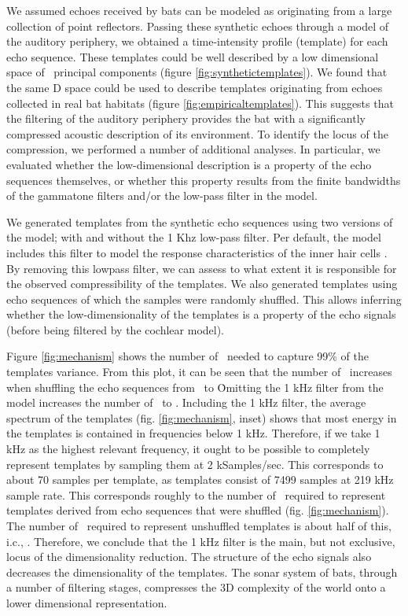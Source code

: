 \documentclass[preprint,5p]{elsarticle}
\begin{document}
We assumed echoes received by bats can be modeled as originating from a large collection of point reflectors. Passing these synthetic echoes through a model of the auditory periphery, we obtained a time-intensity profile (template) for each echo sequence. These templates could be well described by a low dimensional space of \pca\ principal components (figure \ref{fig:synthetictemplates}). We found that the same \pca D space could be used to describe templates originating from echoes collected in real bat habitats (figure \ref{fig:empiricaltemplates}). This suggests that the filtering of the auditory periphery provides the bat with a significantly compressed acoustic description of its environment. To identify the locus of the compression, we performed a number of additional analyses. In particular, we evaluated whether the low-dimensional description is a property of the echo sequences themselves, or whether this property results from the finite bandwidths of the gammatone filters and/or the low-pass filter in the \citet{Wiegrebe2008} model.

We generated templates from the synthetic echo sequences using two versions of the \citet{Wiegrebe2008} model; with and without the 1 Khz low-pass filter. Per default, the model includes this filter to model the response characteristics of the inner hair cells \citep{Meddis2006,Reijniers2010a}. By removing this lowpass filter, we can assess to what extent it is responsible for the observed compressibility of the templates. We also generated templates using echo sequences of which the samples were randomly shuffled. This allows inferring whether the low-dimensionality of the templates is a property of the echo signals (before being filtered by the cochlear model). 

Figure \ref{fig:mechanism} shows the number of \pcs\ needed to capture 99\% of the templates variance. From this plot, it can be seen that the number of \pcs\ increases when shuffling the echo sequences from \pca\ to \FigVIIInumberIII\. Omitting the 1 kHz filter from the  \citet{Wiegrebe2008} model increases the number of \pcs\ to \FigVIIInumberII. Including the 1 kHz filter, the average spectrum of the templates (fig. \ref{fig:mechanism}, inset) shows that most energy in the templates is contained in frequencies below 1 kHz. Therefore, if we take 1 kHz as the highest relevant frequency, it ought to be possible to completely represent templates by sampling them at 2 kSamples/sec. This corresponds to about 70 samples per template, as templates consist of 7499 samples at 219 kHz sample rate. This corresponds roughly to the number of \pcs\ required to represent templates derived from echo sequences that were shuffled  (fig. \ref{fig:mechanism}). The number of \pcs\ required to represent unshuffled templates is about half of this, i.c., \pca. Therefore, we conclude that the 1 kHz filter is the main, but not exclusive, locus of the dimensionality reduction. The structure of the echo signals also decreases the dimensionality of the templates. The sonar system of bats, through a number of filtering stages, compresses the 3D complexity of the world onto a lower dimensional representation.
\end{document}
